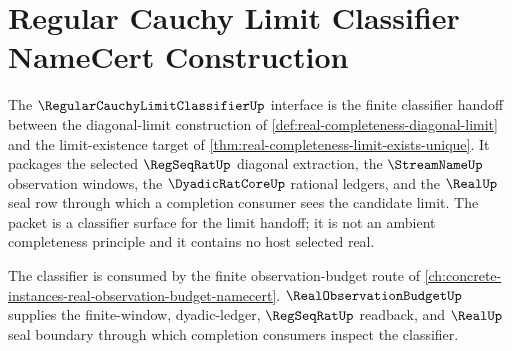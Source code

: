 \chapter{Regular Cauchy Limit Classifier NameCert Construction}
\label{ch:concrete-instances-regularcauchylimitclassifier-namecert}

The $\RegularCauchyLimitClassifierUp$ interface is the finite classifier handoff between the diagonal-limit construction of \autoref{def:real-completeness-diagonal-limit} and the limit-existence target of \autoref{thm:real-completeness-limit-exists-unique}. It packages the selected $\RegSeqRatUp$ diagonal extraction, the $\StreamNameUp$ observation windows, the $\DyadicRatCoreUp$ rational ledgers, and the $\RealUp$ seal row through which a completion consumer sees the candidate limit. The packet is a classifier surface for the limit handoff; it is not an ambient completeness principle and it contains no host selected real.

The classifier is consumed by the finite observation-budget route of \autoref{ch:concrete-instances-real-observation-budget-namecert}. $\RealObservationBudgetUp$ supplies the finite-window, dyadic-ledger, $\RegSeqRatUp$ readback, and $\RealUp$ seal boundary through which completion consumers inspect the classifier.

